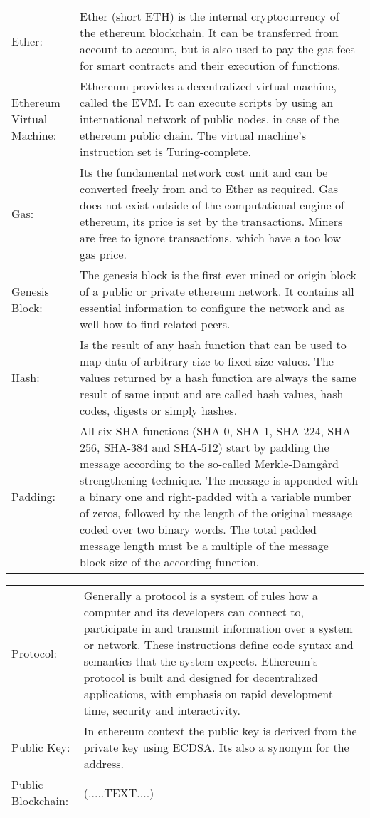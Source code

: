 \begin{center}
	\begin{tabular}{ p{4cm} p{8cm} } 
		Ether: & Ether (short ETH) is the internal cryptocurrency of the ethereum blockchain. It can be transferred from account to account, but is also used to pay the gas fees for smart contracts and their execution of functions. \\
		Ethereum Virtual Machine: & Ethereum provides a decentralized virtual machine, called the \ac{EVM}. It can execute scripts by using an international network of public nodes, in case of the ethereum public chain. The virtual machine's instruction set is Turing-complete. \\
		Gas: & Its the fundamental network cost unit and can be converted freely from and to Ether as required. Gas does not exist outside of the computational engine of ethereum, its price is set by the transactions. Miners are free to ignore transactions, which have a too low gas price. \\
		Genesis Block: & The genesis block is the first ever mined or origin block of a public or private ethereum network. It contains all essential information to configure the network and as well how to find related peers. \\
		Hash: & Is the result of any hash function that can be used to map data of arbitrary size to fixed-size values. The values returned by a hash function are always the same result of same input and are called hash values, hash codes, digests or simply hashes. \\
		Padding: & All six SHA functions (SHA-0, SHA-1, SHA-224, SHA-256, SHA-384 and SHA-512) start by padding the message according to the so-called Merkle-Damg{\aa}rd strengthening technique. The message is appended with a binary one and right-padded with a variable number of zeros, followed by the length of the original message coded over two binary words. The total padded message length must be a multiple of the message block size of the according function. \\
	\end{tabular}
\end{center}

\clearpage

\begin{center}
	\begin{tabular}{ p{4cm} p{8cm} }
		Protocol: & Generally a protocol is a system of rules how a computer and its developers can connect to, participate in and transmit information over a system or network. These instructions define code syntax and semantics that the system expects. Ethereum's protocol is built and designed for decentralized applications, with emphasis on rapid development time, security and interactivity. \\
		Public Key: & In ethereum context the public key is derived from the private key using \ac{ECDSA}. Its also a synonym for the address.  \\
		Public Blockchain: & (.....TEXT....) \\
	\end{tabular}
\end{center}

